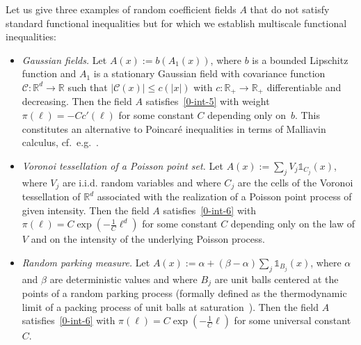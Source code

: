 \documentclass[AHL,Unicode,longabstracts]{cedram}
\newcommand{\R}{\mathbb R}
\begin{document}
Let us give three examples of random coefficient fields $A$ that do not satisfy standard functional inequalities but for which we establish multiscale functional inequalities:
\begin{itemize}
\item \emph{Gaussian fields.} Let $A(x):=b(A_1(x))$, where $b$ is a bounded Lipschitz function and $A_1$ is a stationary Gaussian field with covariance function $\mathcal C:\R^d \to \R$ such that $|\mathcal C(x)|\le c(|x|)$ with $c:\R_+\to \R_+$ differentiable and decreasing. Then the field $A$ satisfies~\eqref{0-int-5} with weight $\pi(\ell)=-C c'(\ell)$ for some constant $C$ depending only on~$b$. This constitutes an alternative to Poincaré inequalities in terms of Malliavin calculus, cf.~e.g.~\cite{Houdre-PerezAbreu-95,Nourdin-Peccati-12}.
\item \emph{Voronoi tessellation of a Poisson point set.} Let $A(x):=\sum_jV_j \mathds1_{C_j}(x)$, where $V_j$ are i.i.d. random variables and where $C_j$ are the cells of the Voronoi tessellation of $\R^d$ associated with the realization of a Poisson point process of given intensity. Then the field $A$ satisfies~\eqref{0-int-6} with $\pi(\ell)=C \exp(-\frac1C \ell^d)$ for some constant $C$ depending only on the law of $V$ and on the intensity of the underlying Poisson process.
\item \emph{Random parking measure.} Let $A(x):=\alpha+(\beta-\alpha)\sum_j \mathds1_{B_j}(x)$, where $\alpha$ and $\beta$ are deterministic values and where $B_j$ are unit balls centered at the points of a random parking process (formally defined as the thermodynamic limit of a packing process of unit balls at saturation~\cite{Penrose-01}). Then the field $A$ satisfies~\eqref{0-int-6} with $\pi(\ell)= C\exp(-\frac1C \ell)$ for some universal constant $C$.
\end{itemize}
\end{document}
